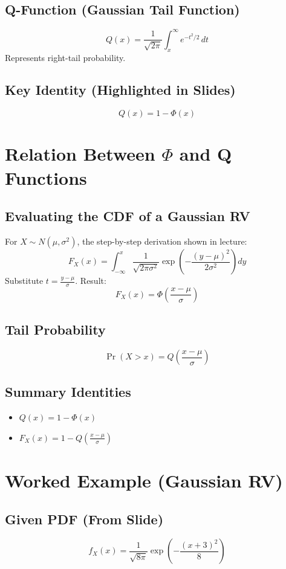 \documentclass[11pt]{article}
\begin{document}
\subsection{Q-Function (Gaussian Tail Function)}
\[ Q(x) = \frac{1}{\sqrt{2\pi}} \int_{x}^{\infty} e^{-t^2/2} \, dt \]
Represents right-tail probability.

\subsection{Key Identity (Highlighted in Slides)}
\[ Q(x) = 1 - \Phi(x) \]

\section{Relation Between $\Phi$ and Q Functions}

\subsection{Evaluating the CDF of a Gaussian RV}
For $X \sim N(\mu, \sigma^2)$, the step-by-step derivation shown in lecture:
\[ F_X(x) = \int_{-\infty}^{x} \frac{1}{\sqrt{2\pi\sigma^2}} \exp\left( -\frac{(y-\mu)^2}{2\sigma^2} \right) dy \]
Substitute $t = \frac{y-\mu}{\sigma}$. Result:
\[ F_X(x) = \Phi\left( \frac{x-\mu}{\sigma} \right) \]

\subsection{Tail Probability}
\[ \Pr(X > x) = Q\left( \frac{x-\mu}{\sigma} \right) \]

\subsection{Summary Identities}
\begin{itemize}
    \item $Q(x) = 1 - \Phi(x)$
    \item $F_X(x) = 1 - Q\left( \frac{x-\mu}{\sigma} \right)$
\end{itemize}

\section{Worked Example (Gaussian RV)}

\subsection{Given PDF (From Slide)}
\[ f_X(x) = \frac{1}{\sqrt{8\pi}} \exp\left( -\frac{(x+3)^2}{8} \right) \]
\end{document}
